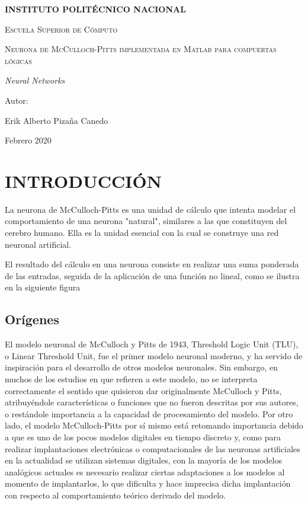 \documentclass[]{article}
\begin{document}
	\begin{titlepage}
		\centering
		{\bfseries\LARGE INSTITUTO POLITÉCNICO NACIONAL \par}
		\vspace{1cm}
		{\scshape\Large Escuela Superior de Cómputo \par}
		\vspace{3cm}
		{\scshape\Huge Neurona de McCulloch-Pitts implementada en Matlab para compuertas lógicas \par}
		\vspace{3cm}
		{\itshape\Large Neural Networks \par}
		\vfill
		{\Large Autor: \par}
		{\Large Erik Alberto Pizaña Canedo \par}
		\vfill
		{\Large Febrero 2020 \par}
	\end{titlepage}
	\section{INTRODUCCIÓN}
	La neurona de McCulloch-Pitts es una unidad de cálculo que intenta modelar el comportamiento de una neurona "natural", similares a las que constituyen del cerebro humano. Ella es la unidad esencial con la cual se construye una red neuronal artificial.
	
	El resultado del cálculo en una neurona consiste en realizar una suma ponderada de las entradas, seguida de la aplicación de una función no lineal, como se ilustra en la siguiente figura

	\subsection{Orígenes}
	El modelo neuronal de McCulloch y Pitts de 1943, Threshold Logic Unit (TLU), o Linear Threshold Unit, fue el primer modelo neuronal moderno, y ha servido de inspiración para el desarrollo de otros modelos neuronales. Sin embargo, en muchos de los estudios en que refieren a este modelo, no se interpreta correctamente el sentido que quisieron dar originalmente McCulloch y Pitts, atribuyéndole características o funciones que no fueron descritas por sus autores, o restándole importancia a la capacidad de procesamiento del modelo. Por otro lado, el modelo McCulloch-Pitts por sí mismo está retomando importancia debido a que es uno de los pocos modelos digitales en tiempo discreto y, como para realizar implantaciones electrónicas o computacionales de las neuronas artificiales en la actualidad se utilizan sistemas digitales, con la mayoría de los modelos analógicos actuales es necesario realizar ciertas adaptaciones a los modelos al momento de implantarlos, lo que dificulta y hace imprecisa dicha implantación con respecto al comportamiento teórico derivado del modelo.	
\end{document}
